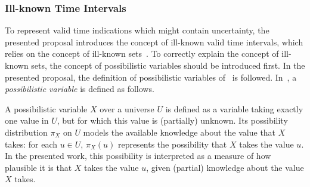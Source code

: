 

\subsubsection{Ill-known Time Intervals}
\label{subsec:representation-time-intervals}

To represent valid time indications which might contain uncertainty, the presented proposal introduces the concept of ill-known valid time intervals, which relies on the concept of ill-known sets~\cite{Dubois88b}. To correctly explain the concept of ill-known sets, the concept of possibilistic variables should be introduced first. In the presented proposal, the definition of possibilistic variables of~\cite{Pon11} is followed. In~\cite{Pon11}, a \emph{possibilistic variable} is defined as follows.

\begin{svgraybox}
\vspace{-10pt}
\begin{definition}
A possibilistic variable $X$ over a universe $U$ is defined as a variable taking exactly one value in $U$, but for which this value is (partially) unknown. Its possibility distribution $\pi_X$ on $U$ models the available knowledge about the value that $X$ takes: for each $u\in U$, $\pi_X(u)$ represents the possibility that $X$ takes the value $u$. In the presented work, this possibility is interpreted as a measure of how plausible it is that $X$ takes the value $u$, given (partial) knowledge about the value $X$ takes.
\end{definition}
\vspace{-10pt}
\end{svgraybox}


